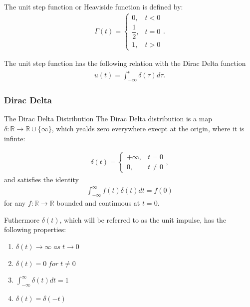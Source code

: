 The unit step function or Heaviside function is defined by:
\begin{align*}
\Gamma(t) =
    \begin{cases}
    0,& t<0\\
    \dfrac{1}{2}, & t=0\\
    1, & t>0
\end{cases}.
\end{align*}


\noindent The unit step function has the following relation with the Dirac Delta function
\begin{align*}
 u(t)=\int_{-\infty}^{t}\delta(\tau)d\tau. 
\end{align*}


\subsubsection{Dirac Delta}
\begin{definition}{The Dirac Delta Distribution} \label{DiracDeltaDef}
The Dirac Delta distribution is a map $\delta : \mathbb{R} \rightarrow \mathbb{R} \cup \{\infty\}$, which yealds zero everywhere execpt at the origin, where it is infinte:

\begin{align*}
\delta(t) =
    \begin{cases}
    +\infty,& t=0\\
    0, & t \neq 0
\end{cases},
\end{align*}
and satisfies the identity
\begin{align*}
    \int_{-\infty}^{\infty} f(t) \delta(t) dt = f(0)
\end{align*}
for any $f: \mathbb{R} \rightarrow \mathbb{R}$ bounded and continuous at $t=0$.
\end{definition}


Futhermore $\delta(t)$, which will be referred to as the unit impulse, has the following properties:
\begin{enumerate}
    \item $\delta(t) \rightarrow \infty \; as \; t \rightarrow 0$
    \item $\delta(t) =0 \; for \; t \neq 0$
    \item $\int_{-\infty}^{\infty} \delta(t) dt =1$
    \item $\delta(t)= \delta(-t)$
\end{enumerate}

